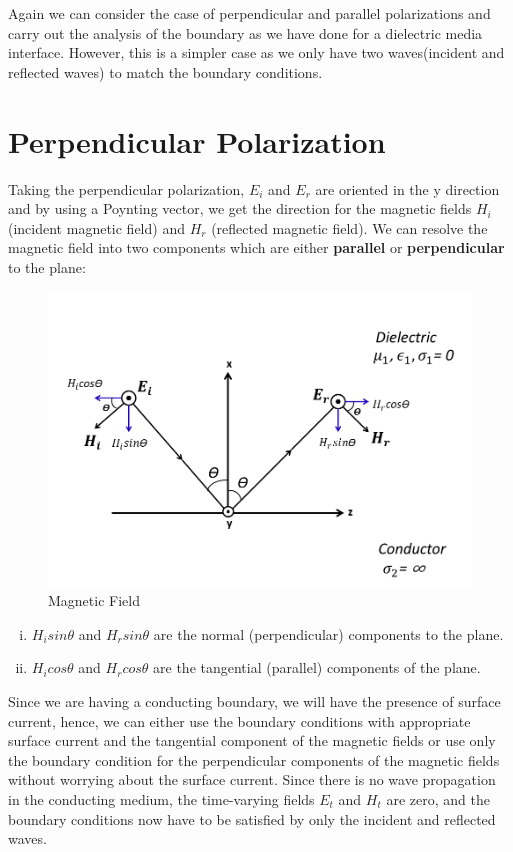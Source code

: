 Again we can consider the case of perpendicular and parallel polarizations and carry out the analysis of the boundary as we have done for a dielectric media interface. However, this is a simpler case as we only have two waves(incident and reflected waves) to match the boundary conditions.

\section{Perpendicular Polarization}
Taking the perpendicular polarization, $E_i$ and $E_r$ are oriented in the y direction and by using a Poynting vector, we get the direction for the magnetic fields $H_i$ (incident magnetic field) and $H_r$ (reflected magnetic field). We can resolve the magnetic field into two components which are either \textbf{parallel} or \textbf{perpendicular} to the plane:

\begin{figure}[h]
\centering
\includegraphics[width=1.02\linewidth]{graphics/perpendicular_polarization_at_dielectric_conductor_interface}
\caption{Magnetic Field}
\label{fig:fields}
\end{figure}

\begin{enumerate}[(i)]
\item $ H_isin\theta $ and $ H_rsin\theta $  are the normal (perpendicular) components to the plane.
\item $ H_icos\theta $ and $ H_rcos\theta $ are the tangential (parallel) components of the plane.
\end{enumerate}
Since we are having a conducting boundary, we will have the presence of surface current, hence, we can either use the boundary conditions with appropriate surface current and the tangential component of the magnetic fields or use only the boundary condition for the perpendicular components of the magnetic fields without worrying about the surface current. Since there is no wave propagation in the conducting medium, the time-varying fields $E_t$ and $H_t$ are zero, and the boundary conditions now have to be satisfied by only the incident and reflected waves.

